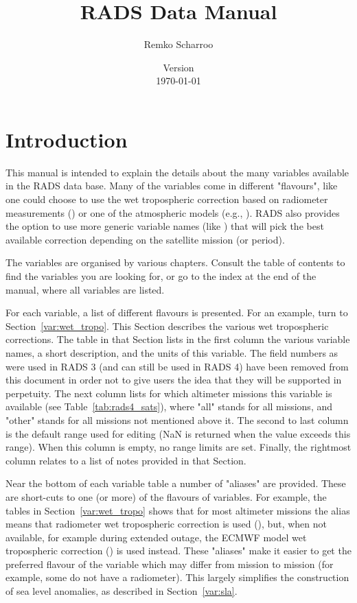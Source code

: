 \documentclass[a4paper,11pt,openany,natbib,nomargin]{thesis}
\title{RADS Data Manual}
\author{Remko Scharroo}
\date{Version \vernum\\\today}
\begin{document}
\maketitle
\tableofcontents


\chapter{Introduction}
\label{ch:intro}
This manual is intended to explain the details about the many variables available in the RADS data base. Many of the variables come in different "flavours", like one could choose to use the wet tropospheric correction based on radiometer measurements () or one of the atmospheric models (e.g., ). RADS also provides the option to use more generic variable names (like ) that will pick the best available correction depending on the satellite mission (or period).

The variables are organised by various chapters. Consult the table of contents to find the variables you are looking for, or go to the index at the end of the manual, where all variables are listed.



For each variable, a list of different flavours is presented. For an example, turn to Section~\ref{var:wet_tropo}. This Section describes the various wet tropospheric corrections. The table in that Section lists in the first column the various variable names, a short description, and the units of this variable. The field numbers as were used in RADS 3 (and can still be used in RADS 4) have been removed from this document in order not to give users the idea that they will be supported in perpetuity. The next column lists for which altimeter missions this variable is available (see Table~\ref{tab:rads4_sats}), where "all" stands for all missions, and "other" stands for all missions not mentioned above it. The second to last column is the default range used for editing (NaN is returned when the value exceeds this range). When this column is empty, no range limits are set. Finally, the rightmost column relates to a list of notes provided in that Section.

Near the bottom of each variable table a number of "aliases" are provided. These are short-cuts to one (or more) of the flavours of variables. For example, the tables in Section~\ref{var:wet_tropo} shows that for most altimeter missions the alias  means that radiometer wet tropospheric correction is used (), but, when not available, for example during extended outage, the ECMWF model wet tropospheric correction () is used instead. These "aliases" make it easier to get the preferred flavour of the variable which may differ from mission to mission (for example, some do not have a radiometer). This largely simplifies the construction of sea level anomalies, as described in Section~\ref{var:sla}.
\end{document}
